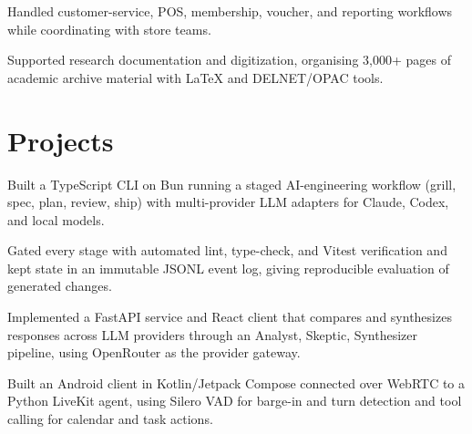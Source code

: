\documentclass{../../../templates/v3/resume-openfont}
\begin{document}
\begin{resumeitemize}
\item Handled customer-service, POS, membership, voucher, and reporting workflows while coordinating with store teams.
\end{resumeitemize}

\begin{resumeitemize}
\item Supported research documentation and digitization, organising 3{,}000+ pages of academic archive material with LaTeX and DELNET/OPAC tools.
\end{resumeitemize}

\section{Projects}
\begin{resumeitemize}
\item Built a TypeScript CLI on Bun running a staged AI-engineering workflow (grill, spec, plan, review, ship) with multi-provider LLM adapters for Claude, Codex, and local models.
\item Gated every stage with automated lint, type-check, and Vitest verification and kept state in an immutable JSONL event log, giving reproducible evaluation of generated changes.
\end{resumeitemize}

\begin{resumeitemize}
\item Implemented a FastAPI service and React client that compares and synthesizes responses across LLM providers through an Analyst, Skeptic, Synthesizer pipeline, using OpenRouter as the provider gateway.
\end{resumeitemize}

\begin{resumeitemize}
\item Built an Android client in Kotlin/Jetpack Compose connected over WebRTC to a Python LiveKit agent, using Silero VAD for barge-in and turn detection and tool calling for calendar and task actions.
\end{resumeitemize}
\end{document}
